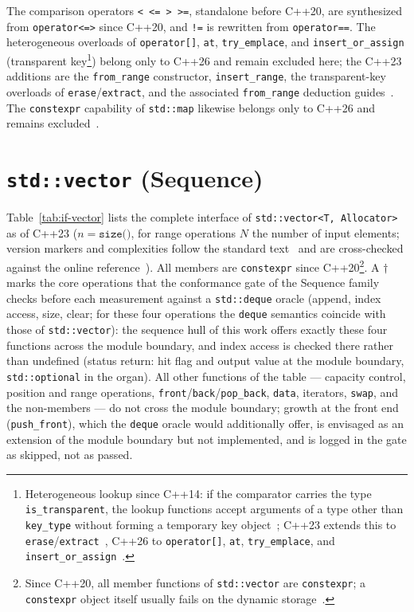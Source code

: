 \noindent The comparison operators \texttt{<\,<=\,>\,>=}, standalone before C++20, are synthesized
from \texttt{operator<=>} since C++20, and \texttt{!=} is rewritten from \texttt{operator==}. The
heterogeneous overloads of \texttt{operator[]}, \texttt{at}, \texttt{try\_emplace}, and
\texttt{insert\_or\_assign} (transparent key\footnote{Heterogeneous lookup since C++14: if the
comparator carries the type \texttt{is\_transparent}, the lookup functions accept arguments of a
type other than \texttt{key\_type} without forming a temporary key
object~\cite{wakely2013heterogeneous}; C++23 extends this to
\texttt{erase}/\texttt{extract}~\cite{boyarinov2021erasure}, C++26 to \texttt{operator[]},
\texttt{at}, \texttt{try\_emplace}, and
\texttt{insert\_or\_assign}~\cite{boyarinov2023heterogeneous}.}) belong only to C++26 and remain
excluded here; the C++23 additions are the \texttt{from\_range} constructor,
\texttt{insert\_range}, the transparent-key overloads of
\texttt{erase}/\texttt{extract}, and the associated \texttt{from\_range} deduction
guides~\cite{jabot2022ranges,boyarinov2021erasure}. The \texttt{constexpr} capability of
\texttt{std::map} likewise belongs only to C++26 and remains excluded~\cite{cppreference_map}.

\section{\texttt{std::vector} (Sequence)}\label{asec:if-vector}
Table~\ref{tab:if-vector} lists the complete interface of \texttt{std::vector<T,\,Allocator>} as of
C++23 ($n=\texttt{size()}$, for range operations $N$ the number of input elements; version markers
and complexities follow the standard text~\cite{iso_cpp} and are cross-checked against the online
reference~\cite{cppreference_vector}). All members are \texttt{constexpr} since
C++20\footnote{Since C++20, all member functions of \texttt{std::vector} are \texttt{constexpr}; a
\texttt{constexpr} object itself usually fails on the dynamic
storage~\cite{dionne2019constexprvector}.}. A $\dagger$ marks the core operations that the
conformance gate of the Sequence family checks before each measurement against a
\texttt{std::deque} oracle (append, index access, size, clear; for these four operations the
\texttt{deque} semantics coincide with those of \texttt{std::vector}): the sequence hull of this
work offers exactly these four functions across the module boundary, and index access is checked
there rather than undefined (status return: hit flag and output value at the module boundary,
\texttt{std::optional} in the organ). All other functions of the table --- capacity control,
position and range operations, \texttt{front}/\texttt{back}/\texttt{pop\_back}, \texttt{data},
iterators, \texttt{swap}, and the non-members --- do not cross the module boundary; growth at the
front end (\texttt{push\_front}), which the \texttt{deque} oracle would additionally offer, is
envisaged as an extension of the module boundary but not implemented, and is logged in the gate as
skipped, not as passed.

